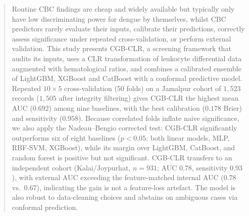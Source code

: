 \documentclass[conference]{IEEEtran}
\begin{document}
\begin{abstract}



Routine CBC findings are cheap and widely available but typically only have
low discriminating power for dengue by themselves, whilst CBC predictors
rarely evaluate their inputs, calibrate their predictions, correctly assess
significance under repeated cross-validation, or perform external validation.
This study presents CGB-CLR, a screening framework that audits its inputs,
uses a CLR transformation of leukocyte differential data augmented with
hematological ratios, and combines a calibrated ensemble of LightGBM, XGBoost
and CatBoost with a conformal predictive model. Repeated $10\times5$
cross-validation (50 folds) on a Jamalpur cohort of $1{,}523$ records
($1{,}505$ after integrity filtering) gives CGB-CLR the highest mean AUC
($0.692$) among nine baselines, with the best calibration ($0.178$ Brier) and
sensitivity ($0.958$). Because correlated folds inflate naive significance, we
also apply the Nadeau--Bengio corrected test: CGB-CLR significantly
outperforms six of eight baselines ($p<0.05$: both linear models, MLP,
RBF-SVM, XGBoost), while its margin over LightGBM, CatBoost, and random forest
is positive but not significant. CGB-CLR transfers to an independent cohort
(Kalai/Joypurhat, $n=931$; AUC $0.78$, sensitivity $0.93$), with external AUC
exceeding the feature-matched internal AUC ($0.78$ vs.\ $0.67$), indicating
the gain is not a feature-loss artefact. The model is also robust to
data-cleaning choices and abstains on ambiguous cases via conformal
prediction.
\end{abstract}
\end{document}
